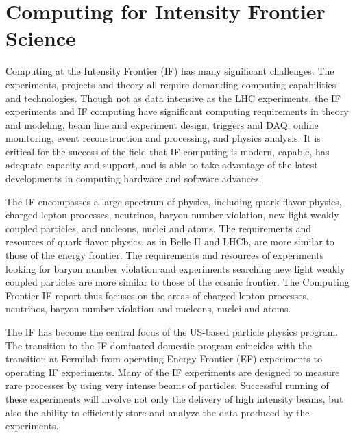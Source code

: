 \section{Computing for Intensity Frontier Science}

Computing at the Intensity Frontier (IF) has many significant challenges. The experiments, projects and theory all require demanding computing capabilities and technologies.  Though not as data intensive as the LHC experiments, the IF experiments and IF computing have significant computing requirements in theory and modeling, beam line and experiment design, triggers and DAQ, online monitoring, event reconstruction and processing, and physics analysis.  It is critical for the success of the field that IF computing is modern, capable, has adequate capacity and support, and is able to take advantage of the latest developments in computing hardware and software advances.

The IF encompasses a large spectrum of physics, including quark flavor physics, 
charged lepton processes, neutrinos, baryon number violation, 
new light weakly coupled particles, and nucleons, nuclei and atoms. 
The requirements and resources of quark flavor physics, as in Belle II and LHCb, 
are more similar to those of the energy frontier. The requirements and resources of 
experiments looking for baryon number violation and 
experiments searching new light weakly coupled particles are more similar to 
those of the cosmic frontier. 
The Computing Frontier IF report thus focuses on the areas of charged lepton processes, 
neutrinos, baryon number violation and nucleons, nuclei and atoms. 

The IF has become the central focus of the US-based particle physics program.
The transition to the IF dominated domestic program coincides with the
transition at Fermilab from operating Energy Frontier (EF) experiments to
operating IF experiments.  Many of the IF experiments are designed to measure
rare processes by using very intense beams of particles.  Successful running
of these experiments will involve not only the delivery of high intensity
beams, but also the ability to efficiently store and analyze the data produced
by the experiments.

